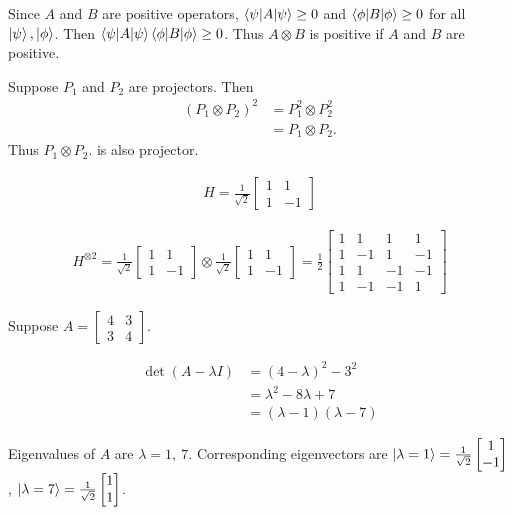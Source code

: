 Since $A$ and $B$ are positive operators,
$\braket{\psi |A| \psi} \geq 0$ and $\braket{\phi | B | \phi} \geq 0$ for all $\ket{\psi}, \ket{\phi} $.
Then $\braket{\psi |A| \psi} \braket{\phi | B | \phi} \geq 0$.
Thus $A \otimes B$ is positive if $A$ and $B$ are positive.


Suppose $P_1$ and $P_2$  are projectors. Then
\begin{align*}
	(P_1 \otimes P_2) ^2 &= P_1^2 \otimes P_2^2\\
		&= P_1 \otimes P_2.
\end{align*}
Thus $ P_1 \otimes P_2.$ is also projector.


\begin{align}
	H  = \frac{1}{\sqrt{2}} \begin{bmatrix}
		1 & 1 \\ 
		1 & -1
	\end{bmatrix}
\end{align}

\begin{align*}
	H^{\otimes 2}
	=
	\frac{1}{\sqrt{2}} \begin{bmatrix}
	1 & 1 \\ 
	1 & -1
	\end{bmatrix}
	\otimes
	\frac{1}{\sqrt{2}} \begin{bmatrix}
	1 & 1 \\ 
	1 & -1
	\end{bmatrix}
	=
	\frac{1}{2} \begin{bmatrix}
		1 & 1 & 1 & 1 \\ 
		1 & -1 & 1 & -1 \\ 
		1 & 1 & -1 & -1 \\ 
		1 & -1 & -1 & 1
	\end{bmatrix}
\end{align*}

Suppose $A = \begin{bmatrix}
4 & 3 \\ 
3 & 4
\end{bmatrix} $.

\begin{align*}
	\det (A - \lambda I ) &= (4-\lambda)^2 - 3^2\\
		&= \lambda^2 -8\lambda + 7\\
		&= (\lambda - 1)(\lambda - 7)
\end{align*}

Eigenvalues of $A$ are $\lambda = 1, ~ 7$.
Corresponding eigenvectors are
$
	\ket{\lambda = 1} = \frac{1}{\sqrt{2}} \begin{bmatrix}
	1 \\ 
	-1
	\end{bmatrix}
$,
$
	\ket{\lambda = 7} = \frac{1}{\sqrt{2}} \begin{bmatrix}
1 \\ 
1
\end{bmatrix}
$.


